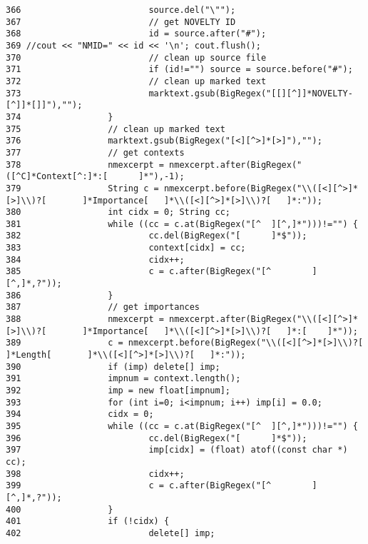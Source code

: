 \begin{verbatim}
366                         source.del("\"");
367                         // get NOVELTY ID
368                         id = source.after("#");
369 //cout << "NMID=" << id << '\n'; cout.flush();
370                         // clean up source file
371                         if (id!="") source = source.before("#");
372                         // clean up marked text
373                         marktext.gsub(BigRegex("[[][^]]*NOVELTY-[^]]*[]]"),"");
374                 }
375                 // clean up marked text
376                 marktext.gsub(BigRegex("[<][^>]*[>]"),"");
377                 // get contexts
378                 nmexcerpt = nmexcerpt.after(BigRegex("([^C]*Context[^:]*:[      ]*"),-1);
379                 String c = nmexcerpt.before(BigRegex("\\([<][^>]*[>]\\)?[       ]*Importance[   ]*\\([<][^>]*[>]\\)?[   ]*:"));
380                 int cidx = 0; String cc;
381                 while ((cc = c.at(BigRegex("[^  ][^,]*")))!="") {
382                         cc.del(BigRegex("[      ]*$"));
383                         context[cidx] = cc;
384                         cidx++;
385                         c = c.after(BigRegex("[^        ][^,]*,?"));
386                 }
387                 // get importances
388                 nmexcerpt = nmexcerpt.after(BigRegex("\\([<][^>]*[>]\\)?[       ]*Importance[   ]*\\([<][^>]*[>]\\)?[   ]*:[    ]*"));
389                 c = nmexcerpt.before(BigRegex("\\([<][^>]*[>]\\)?[      ]*Length[       ]*\\([<][^>]*[>]\\)?[   ]*:"));
390                 if (imp) delete[] imp;
391                 impnum = context.length();
392                 imp = new float[impnum];
393                 for (int i=0; i<impnum; i++) imp[i] = 0.0;
394                 cidx = 0;
395                 while ((cc = c.at(BigRegex("[^  ][^,]*")))!="") {
396                         cc.del(BigRegex("[      ]*$"));
397                         imp[cidx] = (float) atof((const char *) cc);
398                         cidx++;
399                         c = c.after(BigRegex("[^        ][^,]*,?"));
400                 }
401                 if (!cidx) {
402                         delete[] imp;

\end{verbatim}
